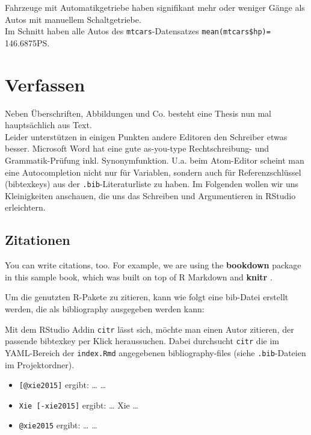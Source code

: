 \documentclass[]{book}
\providecommand{\tightlist}{%
  \setlength{\itemsep}{0pt}\setlength{\parskip}{0pt}}
\theoremstyle{definition}
\theoremstyle{definition}
\theoremstyle{remark}
\begin{document}
Fahrzeuge mit Automatikgetriebe haben signifikant mehr oder weniger
Gänge als Autos mit manuellem Schaltgetriebe.\\
Im Schnitt haben alle Autos des \texttt{mtcars}-Datensatzes
\texttt{mean(mtcars\$hp)=} 146.6875PS.

\chapter{Verfassen}\label{verfassen}

Neben Überschriften, Abbildungen und Co. besteht eine Thesis nun mal
hauptsächlich aus Text.\\
Leider unterstützen in einigen Punkten andere Editoren den Schreiber
etwas besser. Microsoft Word hat eine gute as-you-type Rechtschreibung-
und Grammatik-Prüfung inkl. Synonymfunktion. U.a. beim Atom-Editor
scheint man eine Autocompletion nicht nur für Variablen, sondern auch
für Referenzschlüssel (bibtexkeys) aus der \texttt{.bib}-Literaturliste
zu haben. Im Folgenden wollen wir uns Kleinigkeiten anschauen, die uns
das Schreiben und Argumentieren in RStudio erleichtern.

\section{Zitationen}\label{zitationen}

You can write citations, too. For example, we are using the
\textbf{bookdown} package \citep{R-bookdown} in this sample book, which
was built on top of R Markdown and \textbf{knitr} \citep{xie2015}.

Um die genutzten R-Pakete zu zitieren, kann wie folgt eine bib-Datei
erstellt werden, die als bibliography ausgegeben werden kann:

Mit dem RStudio Addin \texttt{citr} lässt sich, möchte man einen Autor
zitieren, der passende bibtexkey per Klick heraussuchen. Dabei
durchsucht \texttt{citr} die im YAML-Bereich der \texttt{index.Rmd}
angegebenen bibliography-files (siehe \texttt{.bib}-Dateien im
Projektordner).

\begin{itemize}
\tightlist
\item
  \texttt{{[}@xie2015{]}} ergibt: \ldots{} \citep{xie2015} \ldots{}
\item
  \texttt{Xie\ {[}-xie2015{]}} ergibt: \ldots{} Xie
  \citeyearpar{xie2015} \ldots{}
\item
  \texttt{@xie2015} ergibt: \ldots{} \citet{xie2015} \ldots{}
\end{itemize}
\end{document}
